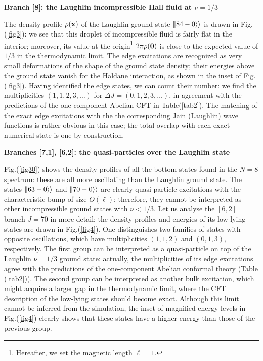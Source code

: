 \bigskip

\bigskip

\bigskip

{\bf Branch [8]: the Laughlin incompressible Hall fluid at $\nu=1/3$}

The density profile $\rho ({\bf x})$ of the Laughlin ground state 
$\Vert 84-0\rangle\rangle $ is drawn in Fig.(\ref{fig3}): 
we see that this droplet of incompressible  fluid
is fairly flat in the interior; moreover, its value at the origin\footnote{
Hereafter, we set the magnetic length $\ell=1$.}
$2\pi\rho({\bf 0} )$ is close to the 
expected value of $1/3$ in the thermodynamic limit.
The edge excitations are recognized as very small deformations of the
shape of the ground state density; their energies above the ground
state vanish for the Haldane interaction, as shown in 
the inset of Fig.(\ref{fig3}).
Having identified the edge states, we can count their
number: we find the multiplicities $(1,1,2,3,\dots)$ for 
$\Delta J=(0,1,2,3,\dots)$, in agreement with the predictions of the 
one-component Abelian CFT in Table(\ref{tab2}).
The matching of the exact edge excitations with the
the corresponding Jain (Laughlin) wave functions is rather obvious in this
case; the total overlap with each exact numerical state is one by construction.

\bigskip

{\bf Branches [7,1], [6,2]: the quasi-particles over the Laughlin state}

Fig.(\ref{fig30}) shows the density profiles of all the bottom states
found in the $N=8$ spectrum: these are all more oscillating than
the Laughlin ground state. 
The states $\Vert 63-0\rangle\rangle$ and  $\Vert 70-0\rangle\rangle$ are clearly quasi-particle
excitations with the characteristic bump of size $O(\ell)$:
therefore, they cannot be interpreted as other incompressible
ground states with $\nu <1/3$.
Let us analyse the $[6,2]$ branch $J=70$ in more detail:
the density profiles and energies of its low-lying states
are drawn in Fig.(\ref{fig4}).
One distinguishes two families of states with opposite oscillations, 
which have multiplicities $(1,1,2)$ and $(0,1,3)$, respectively.  
The first group can be interpreted as a quasi-particle on top of the 
Laughlin $\nu=1/3$ ground state:
actually, the multiplicities of its edge excitations 
agree with the predictions of the one-component Abelian conformal theory
(Table (\ref{tab2})).
The second group can be interpreted as another bulk excitation, 
which might acquire a larger gap in the thermodynamic limit, where
the CFT description of the low-lying states should become exact. 
Although this limit cannot be inferred from the simulation, 
the inset of magnified energy levels in Fig.(\ref{fig4})
clearly shows that these states have a higher energy than those of
the previous group.

